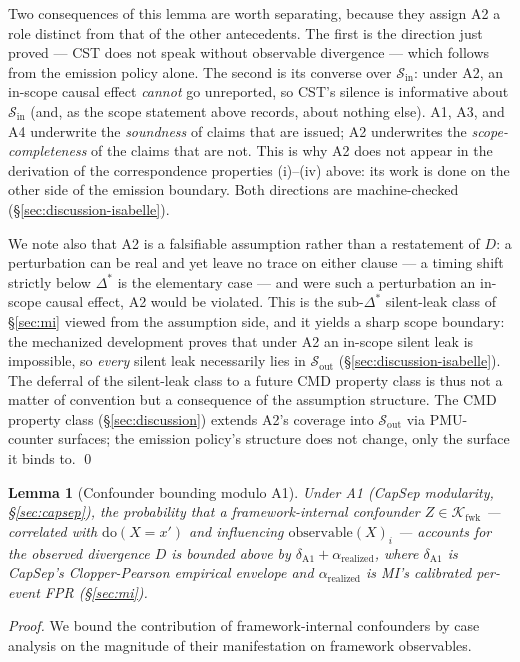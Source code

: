 \documentclass[conference]{IEEEtran}
\newtheorem{lemma}{Lemma}
\newcommand{\Kfwk}{\mathcal{K}_\text{fwk}}
\newcommand{\Dstar}{\Delta^{*}}
\newcommand{\arealized}{\alpha_\text{realized}}
\newcommand{\dox}[1]{\text{do}(X{=}#1)}
\begin{document}
Two consequences of this lemma are worth separating, because they
assign A2 a role distinct from that of the other antecedents. The
first is the direction just proved --- CST does not speak without
observable divergence --- which follows from the emission policy
alone. The second is its converse over
$\mathcal{S}_\text{in}$: under A2, an in-scope causal effect
\emph{cannot} go unreported, so CST's silence is informative about
$\mathcal{S}_\text{in}$ (and, as the scope statement above records,
about nothing else). A1, A3, and A4 underwrite the
\emph{soundness} of claims that are issued; A2 underwrites the
\emph{scope-completeness} of the claims that are not. This is why
A2 does not appear in the derivation of the correspondence
properties (i)--(iv) above: its work is done on the other side of
the emission boundary. Both directions are machine-checked
(\S\ref{sec:discussion-isabelle}).

We note also that A2 is a falsifiable assumption rather than a
restatement of $D$: a perturbation can be real and yet leave no
trace on either clause --- a timing shift strictly below $\Dstar$
is the elementary case --- and were such a perturbation an in-scope
causal effect, A2 would be violated. This is the sub-$\Dstar$
silent-leak class of \S\ref{sec:mi} viewed from the assumption
side, and it yields a sharp scope boundary: the mechanized
development proves that under A2 an in-scope silent leak is
impossible, so \emph{every} silent leak necessarily lies in
$\mathcal{S}_\text{out}$ (\S\ref{sec:discussion-isabelle}). The
deferral of the silent-leak class to a future CMD property class is
thus not a matter of convention but a consequence of the assumption
structure. The CMD property class
(\S\ref{sec:discussion}) extends A2's coverage into
$\mathcal{S}_\text{out}$ via PMU-counter surfaces; the emission
policy's structure does not change, only the surface it binds to.
\qed

\begin{lemma}[Confounder bounding modulo A1]
\label{lem:confounder}
Under A1 (CapSep modularity, \S\ref{sec:capsep}), the probability
that a framework-internal confounder $Z \in \Kfwk$ --- correlated
with $\dox{x'}$ and influencing $\text{observable}(X)_i$ ---
accounts for the observed divergence $D$ is bounded above by
$\delta_{\text{A1}} + \arealized$, where $\delta_{\text{A1}}$ is
CapSep's Clopper-Pearson empirical envelope and $\arealized$ is
MI's calibrated per-event FPR (\S\ref{sec:mi}).
\end{lemma}

\textit{Proof.} We bound the contribution of framework-internal
confounders by case analysis on the magnitude of their
manifestation on framework observables.
\end{document}
